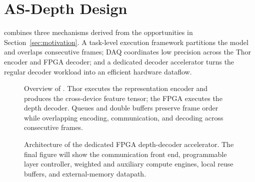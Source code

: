 \section{AS-Depth Design}
\label{sec:design}

\system{} combines three mechanisms derived from the opportunities in
Section~\ref{sec:motivation}.  A task-level execution framework partitions the
model and overlaps consecutive frames; DAQ coordinates low precision across
the Thor encoder and FPGA decoder; and a dedicated decoder accelerator turns
the regular decoder workload into an efficient hardware dataflow.

\begin{figure}[t]
  \centering
  \caption{Overview of \system.  Thor executes the representation encoder and
  produces the cross-device feature tensor; the FPGA executes the depth
  decoder.  Queues and double buffers preserve frame order while overlapping
  encoding, communication, and decoding across consecutive frames.}
  \label{fig:system-overview}
\end{figure}

\begin{figure}[t]
  \centering
  \caption{Architecture of the dedicated FPGA depth-decoder accelerator.  The
  final figure will show the communication front end, programmable layer
  controller, weighted and auxiliary compute engines, local reuse buffers, and
  external-memory datapath.}
  \label{fig:fpga-accelerator}
\end{figure}

